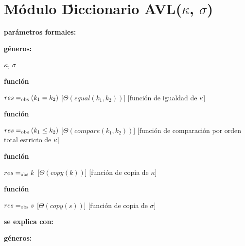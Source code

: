 \section{M\'odulo \'Diccionario AVL($\kappa$, $\sigma$)}

\begin{Interfaz}
  
  \textbf{par\'ametros formales:}\parindent \\
  \parbox{1.7cm}{\textbf{g\'eneros:}} $\kappa$, $\sigma$

  \parbox[t]{1.7cm}{\textbf{funci\'on}}\parbox[t]{\textwidth-2\parindent-1.7cm}{%
    {$res =_{\mathrm{obs}} (k_1 = k_2)$}
    [$\Theta(equal(k_1, k_2))$]
    [funci\'on de igualdad de $\kappa$]
  }

  \parbox[t]{1.7cm}{\textbf{funci\'on}}\parbox[t]{\textwidth-2\parindent-1.7cm}{%
    {$res =_{\mathrm{obs}} (k_1 \leq k_2)$}
    [$\Theta(compare(k_1, k_2))$]
    [funci\'on de comparaci\'on por orden total estricto de $\kappa$]
  }

  \parbox[t]{1.7cm}{\textbf{funci\'on}}\parbox[t]{\textwidth-2\parindent-1.7cm}{%
    {$res =_{\mathrm{obs}} k$}
    [$\Theta(copy(k))$]
    [funci\'on de copia de $\kappa$]
  }
  
  \parbox[t]{1.7cm}{\textbf{funci\'on}}\parbox[t]{\textwidth-2\parindent-1.7cm}{%
    {$res =_{\mathrm{obs}} s$}
    [$\Theta(copy(s))$]
    [funci\'on de copia de $\sigma$]
  }

  \textbf{se explica con:} 

  \textbf{g\'eneros:} 
  
\end{Interfaz}


